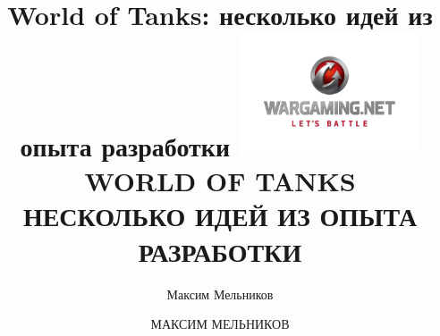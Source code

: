\documentclass[aspectratio=169]{beamer}
\begin{document}
\title{World of Tanks: несколько идей из опыта разработки}
\author{Максим Мельников}
\date{}

{

\title{
    \includegraphics[width=0.4\textwidth]{wg-logo.png}\\
    {\LARGE WORLD OF TANKS\\НЕСКОЛЬКО ИДЕЙ ИЗ ОПЫТА РАЗРАБОТКИ}
}
\author{МАКСИМ МЕЛЬНИКОВ}

\begin{frame}[plain]{}
    \titlepage
\end{frame}

}

\end{document}
